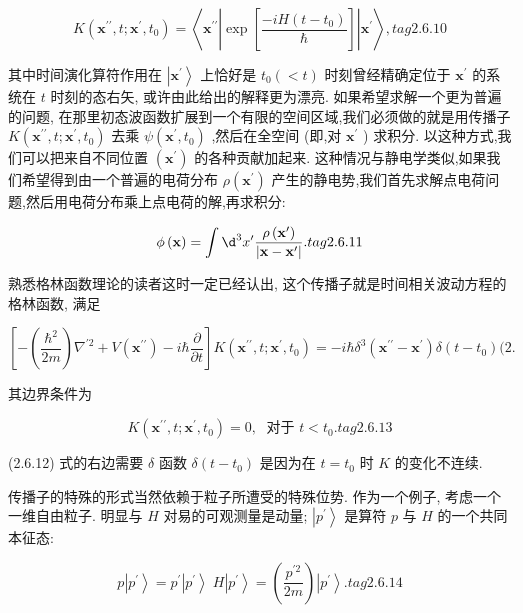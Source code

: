 \documentclass[lang=cn,newtx,10pt,scheme=chinese,thmcnt=section]{elegantbook}
\begin{document}
$$
K\left( {{\mathbf{x}}^{\prime \prime }, t;{\mathbf{x}}^{\prime },{t}_{0}}\right) = \left\langle {{\mathbf{x}}^{\prime \prime }\left| {\exp \left\lbrack \frac{-{iH}\left( {t - {t}_{0}}\right) }{\hbar }\right\rbrack }\right| {\mathbf{x}}^{\prime }}\right\rangle , tag{2.6.10}
$$

其中时间演化算符作用在 $\left| {\mathbf{x}}^{\prime }\right\rangle$ 上恰好是 ${t}_{0}\left( { < t}\right)$ 时刻曾经精确定位于 ${\mathbf{x}}^{\prime }$ 的系统在 $t$ 时刻的态右矢, 或许由此给出的解释更为漂亮. 如果希望求解一个更为普遍的问题, 在那里初态波函数扩展到一个有限的空间区域,我们必须做的就是用传播子 $K\left( {{\mathbf{x}}^{\prime \prime }, t;{\mathbf{x}}^{\prime },{t}_{0}}\right)$ 去乘 $\psi \left( {{\mathbf{x}}^{\prime },{t}_{0}}\right)$ ,然后在全空间 (即,对 ${\mathbf{x}}^{\prime }$ ) 求积分. 以这种方式,我们可以把来自不同位置 $\left( {\mathbf{x}}^{\prime }\right)$ 的各种贡献加起来. 这种情况与静电学类似,如果我们希望得到由一个普遍的电荷分布 $\rho \left( {\mathbf{x}}^{\prime }\right)$ 产生的静电势,我们首先求解点电荷问题,然后用电荷分布乘上点电荷的解,再求积分:

$$
\phi \left( \mathbf{x}\right) = \int {\d}^{3}{x}^{\prime }\frac{\rho \left( {\mathbf{x}}^{\prime }\right) }{\left| \mathbf{x} - {\mathbf{x}}^{\prime }\right| }. tag{2.6.11}
$$

熟悉格林函数理论的读者这时一定已经认出, 这个传播子就是时间相关波动方程的格林函数, 满足

$$
\left\lbrack {-\left( \frac{{\hbar }^{2}}{2m}\right) {\nabla }^{\prime 2} + V\left( {\mathbf{x}}^{\prime \prime }\right) - i\hbar \frac{\partial }{\partial t}}\right\rbrack K\left( {{\mathbf{x}}^{\prime \prime }, t;{\mathbf{x}}^{\prime },{t}_{0}}\right) = - i\hbar {\delta }^{3}\left( {{\mathbf{x}}^{\prime \prime } - {\mathbf{x}}^{\prime }}\right) \delta \left( {t - {t}_{0}}\right) (2.
$$

其边界条件为

$$
K\left( {{\mathbf{x}}^{\prime \prime }, t;{\mathbf{x}}^{\prime },{t}_{0}}\right) = 0,\;\text{ 对于 }t < {t}_{0}. tag{2.6.13}
$$

(2.6.12) 式的右边需要 $\delta$ 函数 $\delta \left( {t - {t}_{0}}\right)$ 是因为在 $t = {t}_{0}$ 时 $K$ 的变化不连续.

传播子的特殊的形式当然依赖于粒子所遭受的特殊位势. 作为一个例子, 考虑一个一维自由粒子. 明显与 $H$ 对易的可观测量是动量; $\left| {p}^{\prime }\right\rangle$ 是算符 $p$ 与 $H$ 的一个共同本征态:

$$
p\left| {p}^{\prime }\right\rangle = {p}^{\prime }\left| {p}^{\prime }\right\rangle \;H\left| {p}^{\prime }\right\rangle = \left( \frac{{p}^{\prime 2}}{2m}\right) \left| {p}^{\prime }\right\rangle . tag{2. 6.14}
$$
\end{document}
